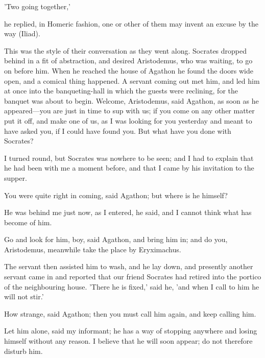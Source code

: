 \documentclass[11pt,letter]{article}
\begin{document}
\par  'Two going together,'

\par  he replied, in Homeric fashion, one or other of them may invent an excuse by the way (Iliad).

\par  This was the style of their conversation as they went along. Socrates dropped behind in a fit of abstraction, and desired Aristodemus, who was waiting, to go on before him. When he reached the house of Agathon he found the doors wide open, and a comical thing happened. A servant coming out met him, and led him at once into the banqueting-hall in which the guests were reclining, for the banquet was about to begin. Welcome, Aristodemus, said Agathon, as soon as he appeared—you are just in time to sup with us; if you come on any other matter put it off, and make one of us, as I was looking for you yesterday and meant to have asked you, if I could have found you. But what have you done with Socrates?

\par  I turned round, but Socrates was nowhere to be seen; and I had to explain that he had been with me a moment before, and that I came by his invitation to the supper.

\par  You were quite right in coming, said Agathon; but where is he himself?

\par  He was behind me just now, as I entered, he said, and I cannot think what has become of him.

\par  Go and look for him, boy, said Agathon, and bring him in; and do you, Aristodemus, meanwhile take the place by Eryximachus.

\par  The servant then assisted him to wash, and he lay down, and presently another servant came in and reported that our friend Socrates had retired into the portico of the neighbouring house. 'There he is fixed,' said he, 'and when I call to him he will not stir.'

\par  How strange, said Agathon; then you must call him again, and keep calling him.

\par  Let him alone, said my informant; he has a way of stopping anywhere and losing himself without any reason. I believe that he will soon appear; do not therefore disturb him.
\end{document}
